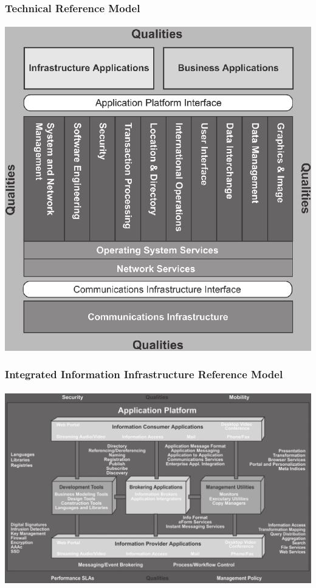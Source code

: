 \documentclass[aspectratio=169, table]{beamer}
\begin{document}
    {
        \begin{frame}
            \frametitle{Technical Reference Model}
            \framesubtitle{\hspace{1cm}}
            \begin{center}
                \includegraphics[width=.53\textwidth]{../figures/detailed_technical_reference_model}
            \end{center}
        \end{frame}
    }

    {
        \begin{frame}
            \frametitle{Integrated Information Infrastructure Reference Model}
            \framesubtitle{\hspace{1cm}}
            \begin{center}
                \includegraphics[width=.90\textwidth]{../figures/integrated_information_infrastructure_reference_model}
            \end{center}
        \end{frame}
    }
\end{document}
